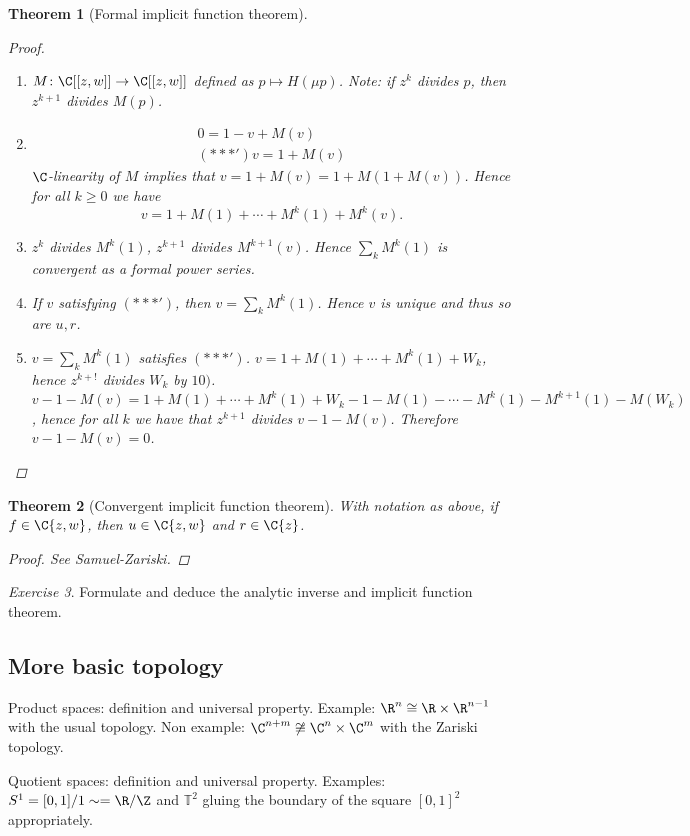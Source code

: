 \documentclass[A4paper, british]{amsart}
\theoremstyle{darkgreentheorem}
\newtheorem{thm}{Theorem}[section]
\theoremstyle{darkbluedefinition}
\theoremstyle{darkredexample}
\theoremstyle{remark}
\newtheorem{exe}[thm]{Exercise}
\newcommand{\1}{\mathbbm{1}}
\begin{document}
\begin{thm}[Formal implicit function theorem]
\begin{proof}
\begin{enumerate}[label=\arabic*)]
\begin{multline*}
	    \end{multline*}
	\item $M\colon \C[[z,w]]\to \C[[z,w]]$ defined as $p\mapsto H(\mu p)$.
	    Note: if $z^{k}$ divides $p$, then $z^{k+1}$ divides $M(p)$.
	\item \begin{multline*}
		0=1-v+M(v) \\
		(***') v=1+M(v)
	    \end{multline*}
		$\C$-linearity of $M$ implies that $v=1+M(v)=1+M(1+M(v))$.
		Hence for all $k\geqslant 0$ we have
		\[ v=1+M(1)+\cdots +M^{k}(1)+M^{k}(v). \]
	\item $z^{k}$ divides $M^{k}(1)$, $z^{k+1}$ divides $M^{k+1}(v)$.
	    Hence $\sum_{k}M^{k}(1)$ is convergent as a formal power series.
	\item If $v$ satisfying $(***')$, then $v=\sum_{k}M^{k}(1)$.
	    Hence $v$ is unique and thus so are $u, r$.
	\item $v=\sum_{k}M^{k}(1)$ satisfies $(***')$.
	    $v=1+M(1)+\cdots +M^{k}(1)+W_{k}$, hence $z^{k+!}$ divides $W_{k}$ by $10)$.
		$v-1-M(v)=1+M(1)+\cdots +M^{k}(1)+W_{k}-1-M(1)-\cdots -M^{k}(1)-M^{k+1}(1)-M(W_{k})$, hence for all $k$ we have that $z^{k+1}$ divides $v-1-M(v)$.
		Therefore $v-1-M(v)=0$.
	\end{enumerate}
    \end{proof}
\end{thm}

\begin{thm}[Convergent implicit function theorem]
    With notation as above, if $f\in \C\{z,w\}$, then $u\in \C\{z,w\}$ and $r\in \C\{z\}$.
    \begin{proof}
	See Samuel-Zariski.
    \end{proof}
\end{thm}

\begin{exe}
    Formulate and deduce the analytic inverse and implicit function theorem.
\end{exe}

\subsection{More basic topology}

Product spaces: definition and universal property.
Example: $\R^{n}\cong \R\times \R^{n-1}$ with the usual topology.
Non example: $\C^{n+m}\not\cong \C^{n}\times \C^{m}$ with the Zariski topology.

Quotient spaces: definition and universal property.
Examples: $S^{1}=[0,1]/1\sim =\R/\Z$ and $\mathbb{T}^{2}$ gluing the boundary of the square $[0,1]^{2}$ appropriately.
\end{document}
